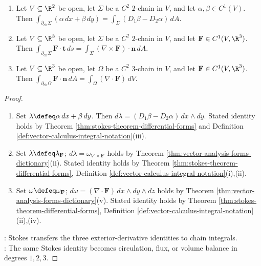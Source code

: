 \begin{theorem} \label{thm:green-stokes-divergence-special-cases} 
\begin{enumerate}[label=(\roman*)]
\setlength{\itemsep}{0pt}
\item Let $V\subseteq\R^2$ be open, let $\Sigma$ be a $C^2$ $2$-chain in $V$, and let $\alpha,\beta\in C^1(V)$. Then $\int_{\partial_{\mathrm{ch}}\Sigma}(\alpha\,dx+\beta\,dy)=\int_{\Sigma}(D_1\beta-D_2\alpha)\,dA$.
\item Let $V\subseteq\R^3$ be open, let $\Sigma$ be a $C^2$ $2$-chain in $V$, and let $\mathbf{F}\in C^1(V,\R^3)$. Then $\int_{\partial_{\mathrm{ch}}\Sigma}\mathbf{F}\cdot\mathbf{t}\,ds=\int_{\Sigma}(\nabla\times\mathbf{F})\cdot\mathbf{n}\,dA$.
\item Let $V\subseteq\R^3$ be open, let $\Omega$ be a $C^2$ $3$-chain in $V$, and let $\mathbf{F}\in C^1(V,\R^3)$. Then $\int_{\partial_{\mathrm{ch}}\Omega}\mathbf{F}\cdot\mathbf{n}\,dA=\int_{\Omega}(\nabla\cdot\mathbf{F})\,dV$.
\end{enumerate}
\begin{proof}
\begin{enumerate}[label=(\roman*)]
\setlength{\itemsep}{0pt}
\item Set $\lambda\defeq\alpha\,dx+\beta\,dy$. Then $d\lambda=(D_1\beta-D_2\alpha)\,dx\wedge dy$. Stated identity holds by Theorem \ref{thm:stokes-theorem-differential-forms} and Definition \ref{def:vector-calculus-integral-notation}(iii).
\item Set $\lambda\defeq\lambda_{\mathbf{F}}$; $d\lambda=\omega_{\nabla\times\mathbf{F}}$ holds by Theorem \ref{thm:vector-analysis-forms-dictionary}(ii). Stated identity holds by Theorem \ref{thm:stokes-theorem-differential-forms}, Definition \ref{def:vector-calculus-integral-notation}(i),(ii).
\item Set $\omega\defeq\omega_{\mathbf{F}}$; $d\omega=(\nabla\cdot\mathbf{F})\,dx\wedge dy\wedge dz$ holds by Theorem \ref{thm:vector-analysis-forms-dictionary}(v). Stated identity holds by Theorem \ref{thm:stokes-theorem-differential-forms}, Definition \ref{def:vector-calculus-integral-notation}(ii),(iv).
\end{enumerate}
: Stokes transfers the three exterior-derivative identities to chain integrals.\\
: The same Stokes identity becomes circulation, flux, or volume balance in degrees $1,2,3$.
\end{proof}
\end{theorem}
